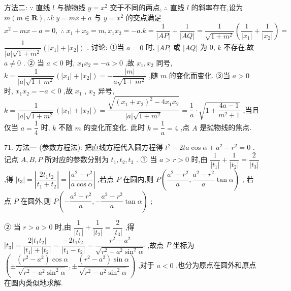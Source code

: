 方法二: $\because$ 直线 $l$ 与抛物线 $y = {x}^{2}$ 交于不同的两点, $\therefore$ 直线 $l$ 的斜率存在,设为 $m\left( {m \in  \mathbf{R}}\right) ,\therefore l : y = {mx} + a$ 与 $y = {x}^{2}$ 的交点满足 ${x}^{2} - {mx} - a = 0,\;\therefore \;{x}_{1} + {x}_{2} = m,{x}_{1}{x}_{2} =  - a.k = \dfrac{1}{\left| AP\right| } + \dfrac{1}{\left| AQ\right| } = \dfrac{1}{\sqrt{1 + {m}^{2}}}\left( {\dfrac{1}{\left| {x}_{1}\right| } + \dfrac{1}{\left| {x}_{2}\right| }}\right)  =$  $\dfrac{1}{\left| a\right| \sqrt{1 + {m}^{2}}}\left( {\left| {x}_{1}\right|  + \left| {x}_{2}\right| }\right)$ . 讨论: ①当 $a = 0$ 时, $\left| {AP}\right|$ 或 $\left| {AQ}\right|$ 为 0, $k$ 不存在,故 $a \neq  0$ . ② 当 $a < 0$ 时, ${x}_{1}{x}_{2} =  - a > 0$ ,故 ${x}_{1},{x}_{2}$ 同号, $k = \dfrac{1}{\left| a\right| \sqrt{1 + {m}^{2}}}\left( {\left| {x}_{1}\right|  + \left| {x}_{2}\right| }\right)  =  - \dfrac{\left| m\right| }{a\sqrt{1 + {m}^{2}}}$ ,随 $m$ 的变化而变化. ③当 $a > 0$ 时, ${x}_{1}{x}_{2} =  - a < 0$ ,故 ${x}_{1}$ , ${x}_{2}$ 异号, $k = \dfrac{1}{\left| a\right| \sqrt{1 + {m}^{2}}}\left( {\left| {x}_{1}\right|  + \left| {x}_{2}\right| }\right)  = \dfrac{\sqrt{{\left( {x}_{1} + {x}_{2}\right) }^{2} - 4{x}_{1}{x}_{2}}}{\left| a\right| \sqrt{1 + {m}^{2}}} = \dfrac{1}{a} \cdot  \sqrt{1 + \dfrac{{4a} - 1}{{m}^{2} + 1}}$ ,当且仅当 $a = \dfrac{1}{4}$ 时, $k$ 不随 $m$ 的变化而变化. 此时 $k = \dfrac{1}{a} = 4$ ,点 $A$ 是抛物线的焦点.

71. 方法一 (参数方程法): 把直线方程代入圆方程得 ${t}^{2} - {2ta}\cos \alpha  + {a}^{2} - {r}^{2} = 0$ . 记点 $A,B,P$ 所对应的参数分别为 ${t}_{1},{t}_{2},{t}_{3}$ . ① 当 $a > r > 0$ 时,由 $\dfrac{1}{\left| {t}_{1}\right| } + \dfrac{1}{\left| {t}_{2}\right| } = \dfrac{2}{\left| {t}_{3}\right| }$ ,得 $\left| {t}_{3}\right|  = \left| \dfrac{2{t}_{1}{t}_{2}}{{t}_{1} + {t}_{2}}\right|  = \left| \dfrac{{a}^{2} - {r}^{2}}{a\cos \alpha }\right|$ ,若点 $P$ 在圆内,则 $P\left( {\dfrac{{a}^{2} - {r}^{2}}{a},\dfrac{{a}^{2} - {r}^{2}}{a}\tan \alpha }\right)$ , 若点 $P$ 在圆外,则 $P\left( {-\dfrac{{a}^{2} - {r}^{2}}{a}, - \dfrac{{a}^{2} - {r}^{2}}{a}\tan \alpha }\right)$ ;

② 当 $r > a > 0$ 时,由 $\dfrac{1}{\left| {t}_{1}\right| } + \dfrac{1}{\left| {t}_{2}\right| } = \dfrac{2}{\left| {t}_{3}\right| }$ ,得 $\left| {t}_{3}\right|  = \dfrac{2\left| {{t}_{1}{t}_{2}}\right| }{\left| {t}_{1}\right|  + \left| {t}_{2}\right| } = \dfrac{-2{t}_{1}{t}_{2}}{\left| {t}_{1} - {t}_{2}\right| } = \dfrac{{r}^{2} - {a}^{2}}{\sqrt{{r}^{2} - {a}^{2}{\sin }^{2}\alpha }}$ ,故点 $P$ 坐标为 $\left( {\pm \dfrac{\left( {{r}^{2} - {a}^{2}}\right) \cos \alpha }{\sqrt{{r}^{2} - {a}^{2}{\sin }^{2}\alpha }}, \pm  \dfrac{\left( {{r}^{2} - {a}^{2}}\right) \sin \alpha }{\sqrt{{r}^{2} - {a}^{2}{\sin }^{2}\alpha }}}\right)$ ,对于 $a < 0$ ,也分为原点在圆外和原点在圆内类似地求解.

